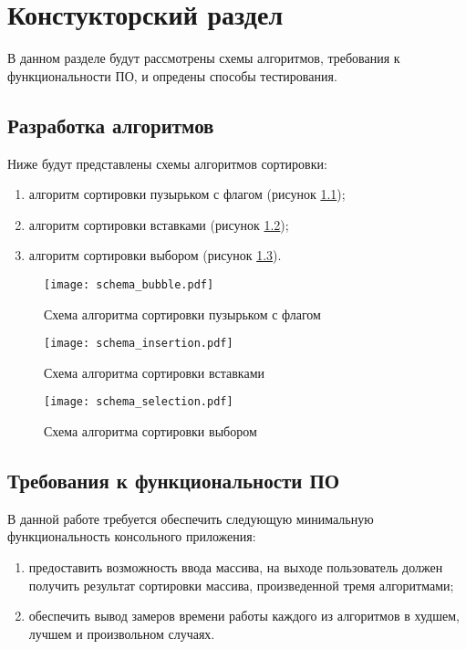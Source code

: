 \chapter{ Констукторский раздел}
\label{cha:design}
    В данном разделе будут рассмотрены схемы алгоритмов, требования к функциональности ПО,
    и опредены способы тестирования.
    
    \section{Разработка алгоритмов}
        Ниже будут представлены схемы алгоритмов сортировки: \begin{enumerate}
            \item алгоритм сортировки пузырьком с флагом (рисунок \ref{schema:sort:bubble});
            \item алгоритм сортировки вставками  (рисунок \ref{schema:sort:insertion});
            \item алгоритм сортировки выбором (рисунок \ref{schema:sort:selection}).
        \end{enumerate}

    \begin{figure}[h!]
        \centering
            \texttt{[image: schema\_bubble.pdf]}
            \caption{Схема алгоритма сортировки пузырьком с флагом}
            \label{schema:sort:bubble}
    \end{figure}

    \begin{figure}[h!]
        \centering
            \texttt{[image: schema\_insertion.pdf]}
            \caption{Схема алгоритма сортировки вставками}
            \label{schema:sort:insertion}
    \end{figure}

    \begin{figure}[h!]
        \centering
            \texttt{[image: schema\_selection.pdf]}
            \caption{Схема алгоритма сортировки выбором}
            \label{schema:sort:selection}
    \end{figure}

    \section{Требования к функциональности ПО}
        В данной работе требуется обеспечить следующую минимальную функциональность консольного приложения:
        \begin{enumerate}
            \item предоставить возможность ввода массива, на выходе пользователь должен получить результат сортировки массива, произведенной тремя алгоритмами;
            \item обеспечить вывод замеров времени работы каждого из алгоритмов в худшем, лучшем и произвольном случаях.
        \end{enumerate}

